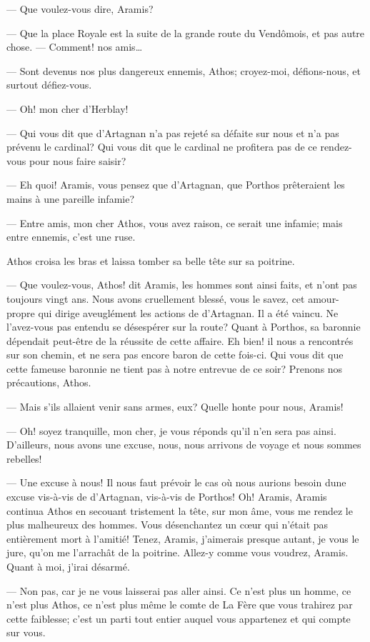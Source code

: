 — Que voulez-vous dire, Aramis?

— Que la place Royale est la suite de la grande route du Vendômois, et pas autre chose.
— Comment! nos amis\dots

— Sont devenus nos plus dangereux ennemis, Athos; croyez-moi, défions-nous, et surtout défiez-vous.

— Oh! mon cher d'Herblay!

— Qui vous dit que d'Artagnan n'a pas rejeté sa défaite sur nous et n'a pas prévenu le cardinal? Qui vous dit que le cardinal ne profitera pas de ce rendez-vous pour nous faire saisir?

— Eh quoi! Aramis, vous pensez que d'Artagnan, que Porthos prêteraient les mains à une pareille infamie?

— Entre amis, mon cher Athos, vous avez raison, ce serait une infamie; mais entre ennemis, c'est une ruse.

Athos croisa les bras et laissa tomber sa belle tête sur sa poitrine.

— Que voulez-vous, Athos! dit Aramis, les hommes sont ainsi faits, et n'ont pas toujours vingt ans. Nous avons cruellement blessé, vous le savez, cet amour-propre qui dirige aveuglément les actions de d'Artagnan. Il a été vaincu. Ne l'avez-vous pas entendu se désespérer sur la route? Quant à Porthos, sa baronnie dépendait peut-être de la réussite de cette affaire. Eh bien! il nous a rencontrés sur son chemin, et ne sera pas encore baron de cette fois-ci. Qui vous dit que cette fameuse baronnie ne tient pas à notre entrevue de ce soir? Prenons nos précautions, Athos.

— Mais s'ils allaient venir sans armes, eux? Quelle honte pour nous, Aramis!

— Oh! soyez tranquille, mon cher, je vous réponds qu'il n'en sera pas ainsi. D'ailleurs, nous avons une excuse, nous, nous arrivons de voyage et nous sommes rebelles!

— Une excuse à nous! Il nous faut prévoir le cas où nous aurions besoin dune excuse vis-à-vis de d'Artagnan, vis-à-vis de Porthos! Oh! Aramis, Aramis continua Athos en secouant tristement la tête, sur mon âme, vous me rendez le plus malheureux des hommes. Vous désenchantez un cœur qui n'était pas entièrement mort à l'amitié! Tenez, Aramis, j'aimerais presque autant, je vous le jure, qu'on me l'arrachât de la poitrine. Allez-y comme vous voudrez, Aramis. Quant à moi, j'irai désarmé.

— Non pas, car je ne vous laisserai pas aller ainsi. Ce n'est plus un homme, ce n'est plus Athos, ce n'est plus même le comte de La Fère que vous trahirez par cette faiblesse; c'est un parti tout entier auquel vous appartenez et qui compte sur vous.


